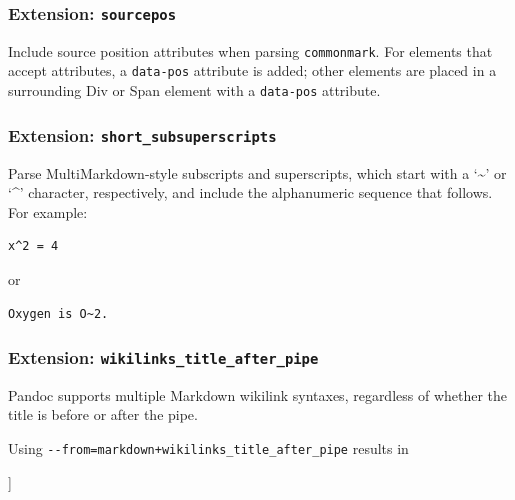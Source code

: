 \documentclass[
]{article}
\newenvironment{Shaded}{}{}
\newcommand{\NormalTok}[1]{#1}
\begin{document}
\hypertarget{extension-sourcepos}{%
\subsubsection{\texorpdfstring{Extension:
\texttt{sourcepos}}{Extension: sourcepos}}\label{extension-sourcepos}}

Include source position attributes when parsing \texttt{commonmark}. For
elements that accept attributes, a \texttt{data-pos} attribute is added;
other elements are placed in a surrounding Div or Span element with a
\texttt{data-pos} attribute.

\hypertarget{extension-short_subsuperscripts}{%
\subsubsection{\texorpdfstring{Extension:
\texttt{short\_subsuperscripts}}{Extension: short\_subsuperscripts}}\label{extension-short_subsuperscripts}}

Parse MultiMarkdown-style subscripts and superscripts, which start with
a `\textasciitilde{}' or `\^{}' character, respectively, and include the
alphanumeric sequence that follows. For example:

\begin{verbatim}
x^2 = 4
\end{verbatim}

or

\begin{verbatim}
Oxygen is O~2.
\end{verbatim}

\hypertarget{extension-wikilinks_title_after_pipe}{%
\subsubsection{\texorpdfstring{Extension:
\texttt{wikilinks\_title\_after\_pipe}}{Extension: wikilinks\_title\_after\_pipe}}\label{extension-wikilinks_title_after_pipe}}

Pandoc supports multiple Markdown wikilink syntaxes, regardless of
whether the title is before or after the pipe.

Using \texttt{-\/-from=markdown+wikilinks\_title\_after\_pipe} results
in

\begin{Shaded}
\begin{Highlighting}[]
\NormalTok{[[URL|title]]}
\end{Highlighting}
\end{Shaded}
\end{document}
